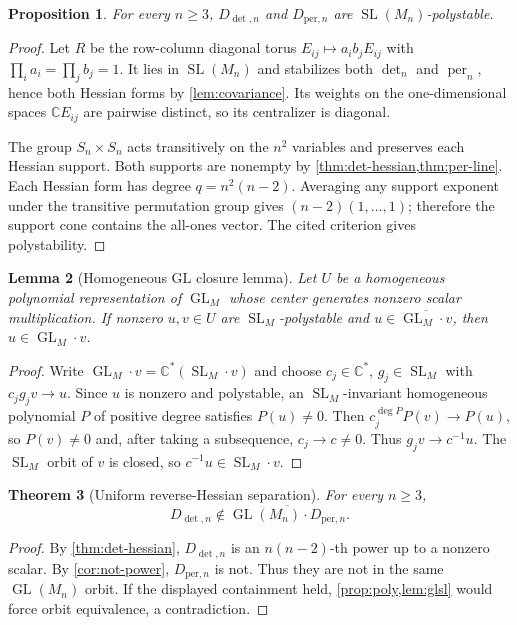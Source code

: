 \documentclass[11pt]{article}
\newtheorem{theorem}{Theorem}[section]
\newtheorem{proposition}[theorem]{Proposition}
\newtheorem{lemma}[theorem]{Lemma}
\theoremstyle{definition}
\theoremstyle{remark}
\DeclareMathOperator{\per}{per}
\newcommand{\C}{\mathbb C}
\newcommand{\GL}{\operatorname{GL}}
\newcommand{\SL}{\operatorname{SL}}
\begin{document}
\begin{proposition}\label{prop:poly}
For every $n\ge3$, $D_{\det,n}$ and $D_{\mathrm{per},n}$ are
$\SL(M_n)$-polystable.
\end{proposition}
\begin{proof}
Let $R$ be the row-column diagonal torus
$E_{ij}\mapsto a_ib_jE_{ij}$ with
$\prod_i a_i=\prod_j b_j=1$.  It lies in $\SL(M_n)$ and stabilizes both
$\det_n$ and $\per_n$, hence both Hessian forms by \cref{lem:covariance}.
Its weights on the one-dimensional spaces $\C E_{ij}$ are pairwise distinct,
so its centralizer is diagonal.

The group $S_n\times S_n$ acts transitively on the $n^2$ variables and
preserves each Hessian support.  Both supports are nonempty by
\cref{thm:det-hessian,thm:per-line}.  Each Hessian form has degree
$q=n^2(n-2)$.  Averaging any support exponent under the transitive permutation
group gives $(n-2)(1,\ldots,1)$; therefore the support cone contains the
all-ones vector.  The cited criterion gives polystability.
\end{proof}

\begin{lemma}[Homogeneous GL closure lemma]\label{lem:glsl}
Let $U$ be a homogeneous polynomial representation of $\GL_M$ whose center
generates nonzero scalar multiplication.  If nonzero $u,v\in U$ are
$\SL_M$-polystable and $u\in\overline{\GL_M\cdot v}$, then
$u\in\GL_M\cdot v$.
\end{lemma}
\begin{proof}
Write $\GL_M\cdot v=\C^*(\SL_M\cdot v)$ and choose
$c_j\in\C^*$, $g_j\in\SL_M$ with $c_jg_jv\to u$.  Since $u$ is nonzero and
polystable, an $\SL_M$-invariant homogeneous polynomial $P$ of positive degree
satisfies $P(u)\ne0$.  Then
$c_j^{\deg P}P(v)\to P(u)$, so $P(v)\ne0$ and, after taking a subsequence,
$c_j\to c\ne0$.  Thus $g_jv\to c^{-1}u$.  The $\SL_M$ orbit of $v$ is closed,
so $c^{-1}u\in\SL_M\cdot v$.
\end{proof}

\begin{theorem}[Uniform reverse-Hessian separation]\label{thm:reverse}
For every $n\ge3$,
\[
D_{\det,n}\notin\overline{\GL(M_n)\cdot D_{\mathrm{per},n}}.
\]
\end{theorem}
\begin{proof}
By \cref{thm:det-hessian}, $D_{\det,n}$ is an $n(n-2)$-th power up to a
nonzero scalar.  By \cref{cor:not-power}, $D_{\mathrm{per},n}$ is not.
Thus they are not in the same $\GL(M_n)$ orbit.  If the displayed containment
held, \cref{prop:poly,lem:glsl} would force orbit equivalence, a contradiction.
\end{proof}
\end{document}
